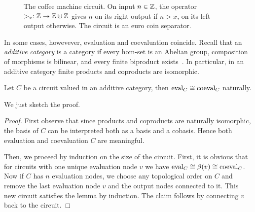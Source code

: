 \begin{figure}[!ht]
  \centering
  
  
  \caption{The coffee machine circuit. On input $n\in\mathbb{Z}$, the operator
    $>_x:\mathbb{Z}\rightarrow\mathbb{Z}\uplus\mathbb{Z}$ gives $n$ on its right output if $n>x$,
    on its left output otherwise. The circuit is an euro coin
    separator.}
  \label{fig:coffee}
\end{figure}

In some cases, howevever, evaluation and coevaluation coincide. Recall
that an \emph{additive category} is a category if every hom-set is an
Abelian group, composition of morphisms is bilinear, and every finite
biproduct exists~\cite[VIII.2]{mclane}. In particular, in an additive
category finite products and coproducts are isomorphic.

\begin{lemma}
  \label{th:coeval}
  Let $C$ be a circuit valued in an additive category, then
  $\operatorname{eval}_C\cong\operatorname{coeval}_C$ naturally.
\end{lemma}
We just sketch the proof.
\begin{proof}
  First observe that since products and coproducts are naturally
  isomorphic, the basis of $C$ can be interpreted both as a basis and
  a cobasis. Hence both evaluation and coevaluation $C$ are
  meaningful.

  Then, we proceed by induction on the size of the circuit. First, it
  is obvious that for circuits with one unique evaluation node $v$ we
  have $\operatorname{eval}_C\cong\beta(v)\cong\operatorname{coeval}_C$. Now if $C$ has $n$
  evaluation nodes, we choose any topological order on $C$ and remove
  the last evaluation node $v$ and the output nodes connected to
  it. This new circuit satisfies the lemma by induction. The claim
  follows by connecting $v$ back to the circuit.
\end{proof}


